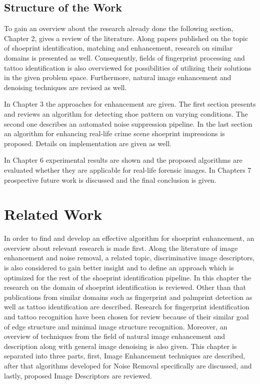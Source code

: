 \documentclass[draft,final]{vutinfth} %
\begin{document}
\section{Structure of the Work}
\par
To gain an overview about the research already done the following section, Chapter 2, gives a review of the literature. 
Along papers published on the topic of shoeprint identification, matching and enhancement, research on similar domains is presented as well.
Consequently, fields of fingerprint processing and tattoo identification is also overviewed for possibilities of utilizing their solutions in the given problem space.
Furthermore, natural image enhancement and denoising techniques are revised as well.
\par
In Chapter 3 the approaches for enhancement are given.
The first section presents and reviews an algorithm for detecting shoe pattern on varying conditions.
The second one describes an automated noise suppression pipeline.
In the last section an algorithm for enhancing real-life crime scene shoeprint impressions is proposed.
Details on implementation are given as well.
\par
In Chapter 6 experimental results are shown and the proposed algorithms are evaluated whether they are applicable for real-life forensic images.
In Chapters 7 prospective future work is discussed and the final conclusion is given. 

\chapter{Related Work}
\par
In order to find and develop an effective algorithm for shoeprint enhancement, an overview about relevant research is made first.
Along the literature of image enhancement and noise removal, a related topic, discriminative image descriptors, is also considered to gain better insight and to define an approach which is optimized for the rest of the shoeprint identification pipeline.
In this chapter the research on the domain of shoeprint identification is reviewed.
Other than that publications from similar domains such as fingerprint and palmprint detection as well as tattoo identification are described.
Research for fingerprint identification and tattoo recognition have been chosen for review because of their similar goal of edge structure and minimal image structure recognition.
Moreover, an overview of techniques from the field of natural image enhancement and description along with general image denoising is also given.
This chapter is separated into three parts, first, Image Enhancement techniques are described, after that algorithms developed for Noise Removal specifically are discussed, and lastly, proposed Image Descriptors are reviewed.
\end{document}
